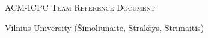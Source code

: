 \documentclass[letterpaper]{article}
\begin{document}
\thispagestyle{fancy}

\begin{center}
	\Huge\textsc{ACM-ICPC Team Reference Document}

	\huge Vilnius University (Šimoliūnaitė, Strakšys, Strimaitis)

	\vspace{0.50cm}
\end{center}

\begin{multicols*}{2}
	\tableofcontents
\end{multicols*}

\enlargethispage*{\baselineskip}
\pagebreak


\setcounter{page}{1}

\begin{multicols*}{2}
	
\end{multicols*}
\end{document}
